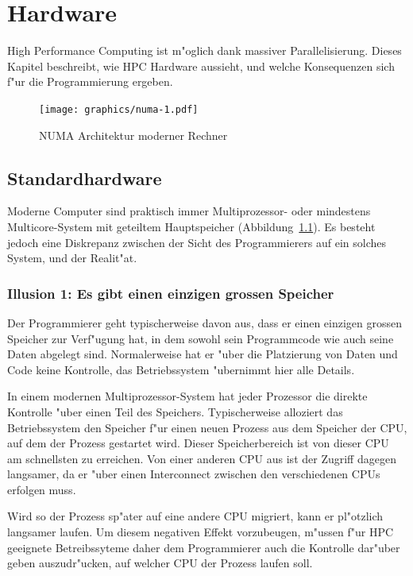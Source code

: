 \chapter{Hardware\label{chapter-hardware}}
High Performance Computing ist m"oglich dank massiver Parallelisierung.
Dieses Kapitel beschreibt, wie HPC Hardware aussieht, und welche Konsequenzen
sich f"ur die Programmierung ergeben.
\begin{figure}
\begin{center}
\texttt{[image: graphics/numa-1.pdf]}
\end{center}
\caption{NUMA Architektur moderner Rechner
\label{numa}}
\end{figure}

\section{Standardhardware}
Moderne Computer sind praktisch immer Multiprozessor- oder mindestens
Multicore-System mit geteiltem Hauptspeicher (Abbildung~\ref{numa}).
Es besteht jedoch eine Diskrepanz zwischen der Sicht des Programmierers
auf ein solches System, und der Realit"at.

\subsection{Illusion 1: Es gibt einen einzigen grossen Speicher}
Der Programmierer geht typischerweise davon aus, dass er einen einzigen
grossen Speicher zur Verf"ugung hat, in dem sowohl sein Programmcode
wie auch seine Daten abgelegt sind.
Normalerweise hat er "uber die Platzierung von Daten und Code keine
Kontrolle, das Betriebssystem "ubernimmt hier alle Details.

In einem modernen Multiprozessor-System hat jeder Prozessor die direkte
Kontrolle "uber einen Teil des Speichers. Typischerweise alloziert das
Betriebssystem den Speicher f"ur einen neuen Prozess aus dem Speicher
der CPU, auf dem der Prozess gestartet wird.
Dieser Speicherbereich ist von dieser CPU am schnellsten zu erreichen.
Von einer anderen CPU aus ist der Zugriff dagegen langsamer, da er 
"uber einen Interconnect zwischen den verschiedenen CPUs erfolgen muss.

Wird so der Prozess sp"ater auf eine andere CPU migriert, kann er pl"otzlich
langsamer laufen. Um diesem negativen Effekt vorzubeugen, m"ussen
f"ur HPC geeignete Betreibssyteme daher dem Programmierer auch die
Kontrolle dar"uber geben auszudr"ucken, auf welcher CPU der Prozess laufen
soll.

